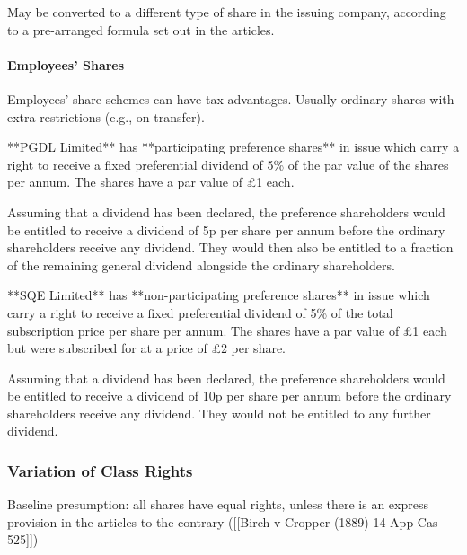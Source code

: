 \documentclass[
]{article}
\newenvironment{Shaded}{}{}
\newcommand{\NormalTok}[1]{#1}
\begin{document}
May be converted to a different type of share in the issuing company,
according to a pre-arranged formula set out in the articles.

\hypertarget{employees-shares}{%
\paragraph{Employees' Shares}\label{employees-shares}}

Employees' share schemes can have tax advantages. Usually ordinary
shares with extra restrictions (e.g., on transfer).

\begin{Shaded}
\begin{Highlighting}[]

\NormalTok{**PGDL Limited** has **participating preference shares** in issue which carry a right to receive a fixed preferential dividend of 5\% of the par value of the shares per annum. The shares have a par value of £1 each.}

\NormalTok{Assuming that a dividend has been declared, the preference shareholders would be entitled to receive a dividend of 5p per share per annum before the ordinary shareholders receive any dividend. They would then also be entitled to a fraction of the remaining general dividend alongside the ordinary shareholders.}

\NormalTok{**SQE Limited** has **non{-}participating preference shares** in issue which carry a right to receive a fixed preferential dividend of 5\% of the total subscription price per share per annum. The shares have a par value of £1 each but were subscribed for at a price of £2 per share.}

\NormalTok{Assuming that a dividend has been declared, the preference shareholders would be entitled to receive a dividend of 10p per share per annum before the ordinary shareholders receive any dividend. They would not be entitled to any further dividend.}
\end{Highlighting}
\end{Shaded}

\hypertarget{variation-of-class-rights}{%
\subsubsection{Variation of Class
Rights}\label{variation-of-class-rights}}

Baseline presumption: all shares have equal rights, unless there is an
express provision in the articles to the contrary ({[}{[}Birch v Cropper
(1889) 14 App Cas 525{]}{]})
\end{document}
